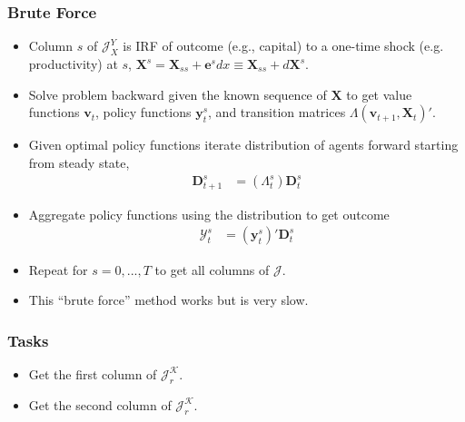 \documentclass[english,xcolor=svgnames]{beamer}
\begin{document}
\begin{frame}
    \frametitle{Brute Force}
    \begin{itemize}
    	\item Column $s$ of $\mathcal{J}_X^Y$ is IRF of outcome (e.g., capital) to a one-time shock (e.g. productivity) at $s$, $\bm{X}^s = \bm{X}_{ss} + \bm{e}^s dx \equiv \bm{X}_{ss} + d \bm{X}^s$. 
        \item Solve problem backward given the known sequence of $\bm{X}$ to get value functions $\bm{v}_{t}$, policy functions $\bm{y}_t^s$, and transition matrices $\Lambda(\bm{v}_{t+1},\bm{X}_t)'$.
        \item Given optimal policy functions iterate distribution of agents forward starting from steady state,
        \begin{align*}
    		\bm{D}_{t+1}^s &= (\Lambda_t^s) \bm{D}_t^s 
    	\end{align*}
        \item Aggregate policy functions using the distribution to get outcome
        \begin{align*}
    		\mathcal{Y}_t^s &= (\bm{y}_t^s)'\bm{D}_t^s 
    	\end{align*}
        \item Repeat for $s=0,...,T$ to get all columns of $\mathcal{J}$.
        \item This ``brute force'' method works but is very slow.
    \end{itemize}
\end{frame}

\begin{frame}
    \frametitle{Tasks}
    \begin{itemize}
        \item Get the first column of $\mathcal{J}_r^{\mathcal{K}}$.
        \item Get the second column of $\mathcal{J}_r^{\mathcal{K}}$.
	\end{itemize}
\end{frame}
\end{document}
